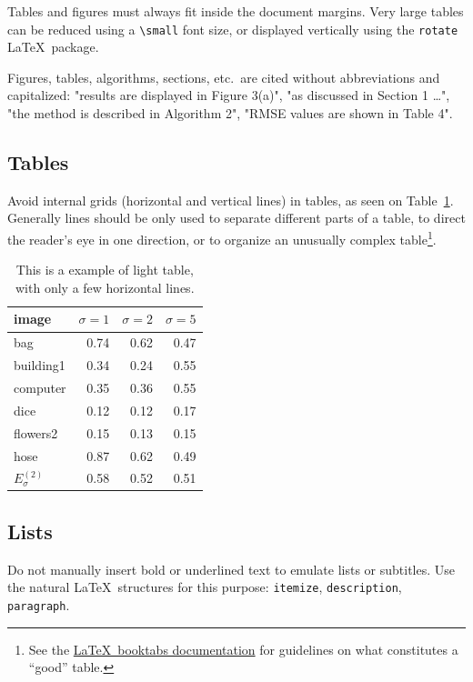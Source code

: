 \documentclass{ipol}
\begin{document}
Tables and figures must always fit inside the document margins. Very
large tables can be reduced using a \verb|\small| font size, or
displayed vertically using the \texttt{rotate} \LaTeX\ package.

Figures, tables, algorithms, sections, etc.\ are cited without
abbreviations and capitalized: "results are displayed in Figure
3(a)", "as discussed in Section 1 \ldots", "the method is described in
Algorithm 2", "RMSE values are shown in Table 4". 

\subsection{Tables}

Avoid internal grids (horizontal and vertical lines) in
tables, as seen on Table~\ref{tbl:example}. Generally lines should be
only used to separate different parts of a table, to direct the
reader's eye in one direction, or to organize an unusually complex
table\footnote{See the 
  \href{http://mirrors.ctan.org/macros/latex/contrib/booktabs/booktabs.pdf}{\LaTeX\ booktabs
    documentation} for guidelines on what constitutes a ``good''
  table.}.

\begin{table}[!htbp]
\begin{center}
\begin{tabular}{l r r r}
\hline
image & $\sigma=1$ & $\sigma=2$ & $\sigma=5$ \\
\hline
bag & 0.74 & 0.62 & 0.47 \\
building1 & 0.34 & 0.24 & 0.55 \\
computer & 0.35 & 0.36 & 0.55 \\
dice & 0.12 & 0.12 & 0.17 \\
flowers2 & 0.15 & 0.13 & 0.15 \\
hose & 0.87 & 0.62 & 0.49 \\
\hline
$E^{(2)}_\sigma$ & 0.58 & 0.52 & 0.51 \\
\hline
\end{tabular}
\caption{This is a example of light table, with only a few horizontal lines.}
\label{tbl:example}
\end{center}
\end{table}

\subsection{Lists}

Do not manually insert bold or underlined text to emulate lists or
subtitles. Use the natural \LaTeX\ structures for this purpose:
\verb|itemize|, \verb|description|, \verb|paragraph|.
\end{document}
